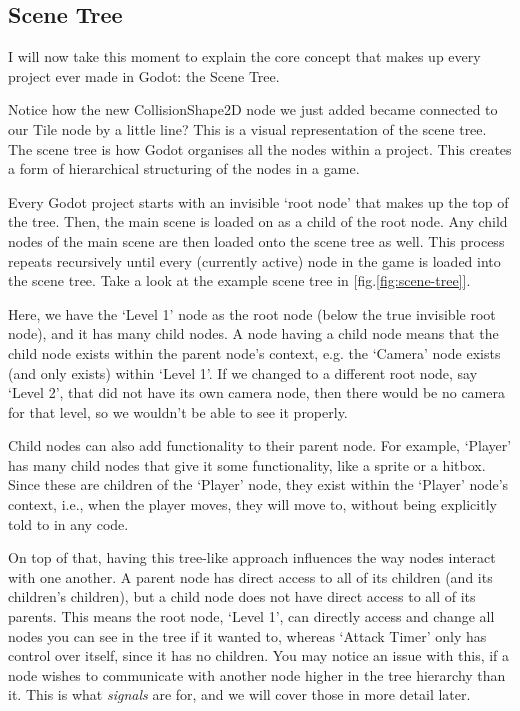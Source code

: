 \documentclass[14pt]{extarticle}
\newcommand{\prettyref}[2]{[{#1}.\ref{#2}]}
\begin{document}
\subsection*{Scene Tree}
I will now take this moment to explain the core concept that makes up every project ever made in Godot: the Scene Tree.

Notice how the new CollisionShape2D node we just added became connected to our Tile node by a little line? This is a visual representation of the scene tree. The scene tree is how Godot organises all the nodes within a project. This creates a form of hierarchical structuring of the nodes in a game.

Every Godot project starts with an invisible `root node' that makes up the top of the tree. Then, the main scene is loaded on as a child of the root node. Any child nodes of the main scene are then loaded onto the scene tree as well. This process repeats recursively until every (currently active) node in the game is loaded into the scene tree. Take a look at the example scene tree in \prettyref{fig}{fig:scene-tree}.


Here, we have the `Level 1' node as the root node (below the true invisible root node), and it has many child nodes. A node having a child node means that the child node exists within the parent node's context, e.g. the `Camera' node exists (and only exists) within `Level 1'. If we changed to a different root node, say `Level 2', that did not have its own camera node, then there would be no camera for that level, so we wouldn't be able to see it properly.

Child nodes can also add functionality to their parent node. For example, `Player' has many child nodes that give it some functionality, like a sprite or a hitbox. Since these are children of the `Player' node, they exist within the `Player' node's context, i.e., when the player moves, they will move to, without being explicitly told to in any code.

On top of that, having this tree-like approach influences the way nodes interact with one another. A parent node has direct access to all of its children (and its children's children), but a child node does not have direct access to all of its parents. This means the root node, `Level 1', can directly access and change all nodes you can see in the tree if it wanted to, whereas `Attack Timer' only has control over itself, since it has no children. You may notice an issue with this, if a node wishes to communicate with another node higher in the tree hierarchy than it. This is what \textit{signals} are for, and we will cover those in more detail later.
\end{document}
